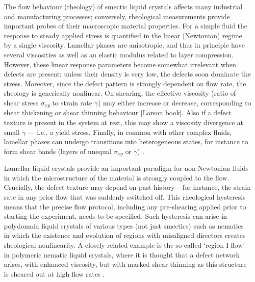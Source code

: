 \documentclass[8.5pt,twoside,twocolumn]{article}
\begin{document}
The flow behaviour (rheology) of smectic liquid crystals affects many industrial and manufacturing processes; conversely, rheological measurements provide important probes of their macroscopic material properties.
For a simple fluid the response to steady applied stress is quantified in the linear (Newtonian) regime by a single viscosity. Lamellar phases are anisotropic, and thus in principle have several viscosities as well as an elastic modulus related to layer compression. However, these linear response parameters become somewhat irrelevant when defects are present: unless their density is very low, the defects soon dominate the stress. Moreover, since the defect pattern is strongly dependent on flow rate, the rheology is generically nonlinear. On shearing, the effective viscosity (ratio of shear stress $\sigma_{xy}$  to strain rate $\dot\gamma$) may either increase or decrease, corresponding
to shear thickening or shear thinning behaviour [Larson book]. Also if a defect texture is present in the system at rest, this may show a viscosity divergence at small $\dot \gamma$ --- i.e., a yield stress.
Finally, in common with other complex fluids, lamellar phases can undergo transitions into heterogeneous states, for instance to form shear bands (layers of unequal $\sigma_{xy}$ or $\dot\gamma$) \cite{Olmsted08}. 

Lamellar liquid crystals provide an important paradigm for non-Newtonian fluids in which the microstructure of the material is strongly coupled to the flow. Crucially, the defect texture may depend on past history -- for instance, the strain rate in any prior flow that was suddenly switched off. This rheological hysteresis means that the precise flow protocol, including any pre-shearing applied prior to starting the experiment, needs to be specified. Such hysteresis can arise in polydomain liquid crystals of various types (not just smectics) such as nematics in which the existence and evolution of regions with misaligned directors creates rheological nonlinearity. A closely related example is the so-called `region I flow' in polymeric nematic liquid crystals, where it is thought that a defect network arises, with enhanced viscosity, but with
marked shear thinning as this structure is sheared out at high flow rates \cite{Larson}. 
\end{document}

